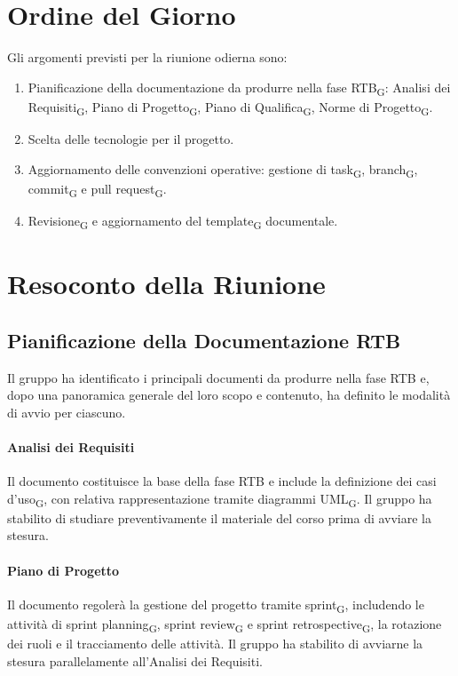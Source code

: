 \section{Ordine del Giorno}
Gli argomenti previsti per la riunione odierna sono:
\begin{enumerate}
	\item Pianificazione della documentazione da produrre nella fase RTB\textsubscript{G}:
	      Analisi dei Requisiti\textsubscript{G}, Piano di Progetto\textsubscript{G}, Piano di Qualifica\textsubscript{G},
	      Norme di Progetto\textsubscript{G}.
	\item Scelta delle tecnologie per il progetto.
	\item Aggiornamento delle convenzioni operative: gestione di task\textsubscript{G},
	      branch\textsubscript{G}, commit\textsubscript{G} e pull request\textsubscript{G}.
	\item Revisione\textsubscript{G} e aggiornamento del template\textsubscript{G} documentale.
\end{enumerate}

\newpage
\section{Resoconto della Riunione}

\subsection{Pianificazione della Documentazione RTB}

Il gruppo ha identificato i principali documenti da produrre nella fase RTB
e, dopo una panoramica generale del loro scopo e contenuto, ha definito le
modalità di avvio per ciascuno.

\paragraph{Analisi dei Requisiti} 
Il documento costituisce la base della fase RTB e include la definizione dei casi d'uso\textsubscript{G}, con relativa
rappresentazione tramite diagrammi UML\textsubscript{G}. Il gruppo ha stabilito di studiare
preventivamente il materiale del corso prima di avviare la stesura.

\paragraph{Piano di Progetto}
Il documento regolerà la gestione del progetto tramite sprint\textsubscript{G}, includendo
le attività di sprint planning\textsubscript{G}, sprint review\textsubscript{G} e sprint retrospective\textsubscript{G},
la rotazione dei ruoli e il tracciamento delle attività. Il gruppo ha
stabilito di avviarne la stesura parallelamente all'Analisi dei Requisiti.

